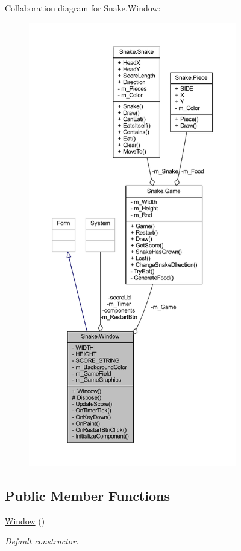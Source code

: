 Collaboration diagram for Snake.\+Window\+:
\nopagebreak
\begin{figure}[H]
\begin{center}
\leavevmode
\includegraphics[height=550pt]{d4/d19/class_snake_1_1_window__coll__graph}
\end{center}
\end{figure}
\subsection*{Public Member Functions}
\begin{DoxyCompactItemize}
\item 
\mbox{\hyperlink{class_snake_1_1_window_ab6ea319a57aaf8656b86df24bab0f810}{Window}} ()
\begin{DoxyCompactList}\small\item\em Default constructor. \end{DoxyCompactList}\end{DoxyCompactItemize}
